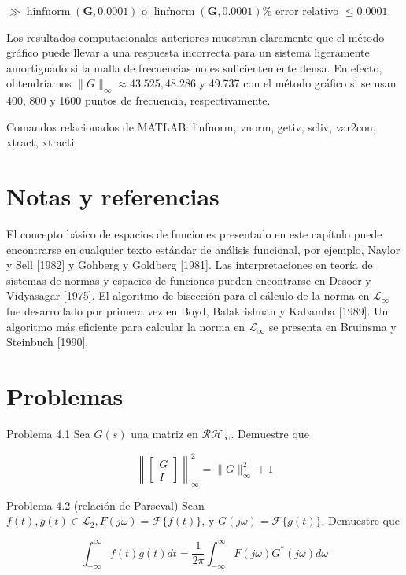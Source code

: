 $\gg \operatorname{hinfnorm}(\mathbf{G}, \mathbf{0.0001})$ o $\operatorname{linfnorm}(\mathbf{G}, \mathbf{0.0001}) \%$ error relativo $\leq 0.0001$.


Los resultados computacionales anteriores muestran claramente que el método gráfico puede llevar a una respuesta incorrecta para un sistema ligeramente amortiguado si la malla de frecuencias no es suficientemente densa. En efecto, obtendríamos $\|G\|_{\infty} \approx 43.525, 48.286$ y 49.737 con el método gráfico si se usan 400, 800 y 1600 puntos de frecuencia, respectivamente.

Comandos relacionados de MATLAB: linfnorm, vnorm, getiv, scliv, var2con, xtract, xtracti

\section{Notas y referencias}
El concepto básico de espacios de funciones presentado en este capítulo puede encontrarse en cualquier texto estándar de análisis funcional, por ejemplo, Naylor y Sell [1982] y Gohberg y Goldberg [1981]. Las interpretaciones en teoría de sistemas de normas y espacios de funciones pueden encontrarse en Desoer y Vidyasagar [1975]. El algoritmo de bisección para el cálculo de la norma en $\mathcal{L}_{\infty}$ fue desarrollado por primera vez en Boyd, Balakrishnan y Kabamba [1989]. Un algoritmo más eficiente para calcular la norma en $\mathcal{L}_{\infty}$ se presenta en Bruinsma y Steinbuch [1990].

\section{Problemas}
Problema 4.1 Sea $G(s)$ una matriz en $\mathcal{R} \mathcal{H}_{\infty}$. Demuestre que

$$
\left\|\left[\begin{array}{c}
G \\
I
\end{array}\right]\right\|_{\infty}^{2}=\|G\|_{\infty}^{2}+1
$$

Problema 4.2 (relación de Parseval) Sean $f(t), g(t) \in \mathcal{L}_{2}, F(j \omega)=\mathcal{F}\{f(t)\}$, y $G(j \omega)=\mathcal{F}\{g(t)\}$. Demuestre que

$$
\int_{-\infty}^{\infty} f(t) g(t) d t=\frac{1}{2 \pi} \int_{-\infty}^{\infty} F(j \omega) G^{*}(j \omega) d \omega
$$

